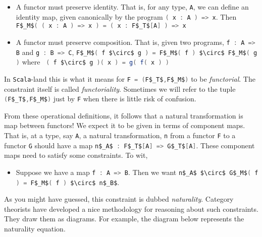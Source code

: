 \begin{itemize}
\item A functor must preserve identity. That is, for any type,
  \lstinline[language=Scala,mathescape=true]!A!, we can define an
  identity map, given canonically by the program
  \lstinline[language=Scala,mathescape=true]!( x : A ) => x!. Then
  \lstinline[language=Scala,mathescape=true]!F$_M$( ( x : A ) => x ) = ( x : F$_T$[A] ) => x!
  \item A functor must preserve composition. That is, given two programs, \lstinline[language=Scala,mathescape=true]!f : A => B! and \lstinline[language=Scala,mathescape=true]!g : B => C!, \lstinline[language=Scala,mathescape=true]!F$_M$( f $\circ$ g ) = F$_M$( f ) $\circ$ F$_M$( g )! where \lstinline[language=Scala,mathescape=true]! ( f $\circ$ g )( x ) = g( f( x ) )!
\end{itemize}

In \texttt{Scala}-land this is what it means for
\lstinline[language=Scala,mathescape=true]!F = (F$_T$,F$_M$)! to be
\emph{functorial}. The constraint itself is called
\emph{functoriality}. Sometimes we will refer to the tuple
\lstinline[language=Scala,mathescape=true]!(F$_T$,F$_M$)! just by
\lstinline[language=Scala,mathescape=true]!F! when there is little
risk of confusion.

From these operational definitions, it follows that a natural
transformation is map between functors! We expect it to be given in
terms of component maps. That is, at a type, say
\lstinline[language=Scala,mathescape=true]!A!, a natural
transformation, \lstinline[language=Scala,mathescape=true]!n! from a
functor \lstinline[language=Scala,mathescape=true]!F! to a functor
\lstinline[language=Scala,mathescape=true]!G! should have a map
\lstinline[language=Scala,mathescape=true]!n$_A$ : F$_T$[A] => G$_T$[A]!.
These component maps need to satisfy some constraints. To wit,

\begin{itemize}
  \item Suppose we have a map \lstinline[language=Scala,mathescape=true]!f : A => B!. Then we want \lstinline[language=Scala,mathescape=true]!n$_A$ $\circ$ G$_M$( f ) = F$_M$( f ) $\circ$ n$_B$!.
\end{itemize}

As you might have guessed, this constraint is dubbed
\emph{naturality}. Category theorists have developed a nice
methodology for reasoning about such constraints. They draw them as
diagrams. For example, the diagram below represents the naturality
equation.

